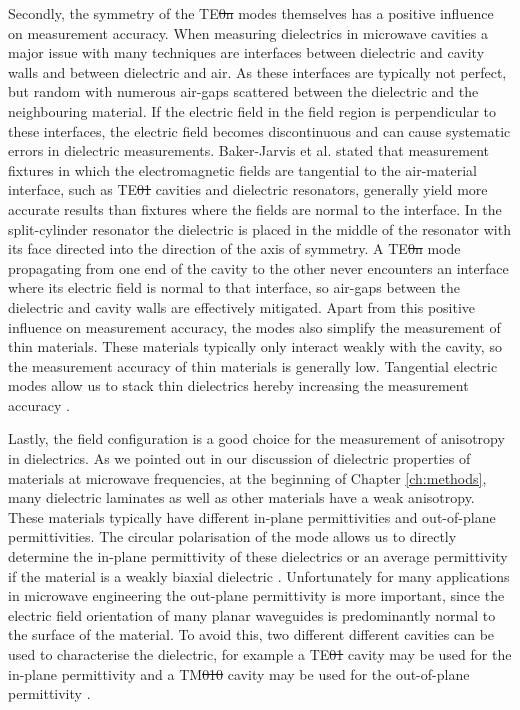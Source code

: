 Secondly, the symmetry of the TE\st{0n} modes themselves has a positive influence on measurement accuracy. When measuring dielectrics in microwave cavities a major issue with many techniques are interfaces between dielectric and cavity walls and between dielectric and air. As these interfaces are typically not perfect, but random with numerous air-gaps scattered between the dielectric and the neighbouring material. If the electric field in the field region is perpendicular to these interfaces, the electric field becomes discontinuous and can cause systematic errors in dielectric measurements. Baker-Jarvis et al. \cite{tn1520} stated that measurement fixtures in which the electromagnetic fields are tangential to the air-material interface, such as TE\st{01} cavities and dielectric resonators, generally yield more accurate results than fixtures where the fields are normal to the interface. In the split-cylinder resonator the dielectric is placed in the middle of the resonator with its face directed into the direction of the axis of symmetry. A TE\st{0n} mode propagating from one end of the cavity to the other never encounters an interface where its electric field is normal to that interface, so air-gaps between the dielectric and cavity walls are effectively mitigated. Apart from this positive influence on measurement accuracy, the modes also simplify the measurement of thin materials. These materials typically only interact weakly with the cavity, so the measurement accuracy of thin materials is generally low. Tangential electric modes allow us to stack thin dielectrics hereby increasing the measurement accuracy \cite{NPL}.

Lastly, the field configuration is a good choice for the measurement of anisotropy in dielectrics. As we pointed out in our discussion of dielectric properties of materials at microwave frequencies, at the beginning of Chapter \ref{ch:methods}, many dielectric laminates as well as other materials have a weak anisotropy. These materials typically have different in-plane permittivities and out-of-plane permittivities. The circular polarisation of the mode allows us to directly determine the in-plane permittivity of these dielectrics or an average permittivity if the material is a weakly biaxial dielectric \cite{kent1996}. Unfortunately for many applications in microwave engineering the out-plane permittivity is more important, since the electric field orientation of many planar waveguides is predominantly normal to the surface of the material. To avoid this, two different different cavities can be used to characterise the dielectric, for example a TE\st{01} cavity may be used for the in-plane permittivity and a TM\st{010} cavity may be used for the out-of-plane permittivity \cite{dankov}.
